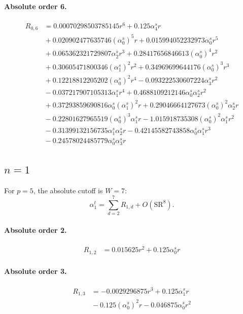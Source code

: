 \documentclass[10pt]{article}
\begin{document}
\paragraph{Absolute order 6.}
\begin{align*}
R_{0,6} &= 0.00070298503785145 r^{6} + 0.125 \alpha_{4}^s r \\
&{}  + 0.020902477635746 \left(\alpha_{0}^s\right)^{5} r + 0.015994052232973 \alpha_{0}^s r^{5} \\
&{}  + 0.065362321729807 \alpha_{2}^s r^{3} + 0.28417656846613 \left(\alpha_{0}^s\right)^{4} r^{2} \\
&{}  + 0.30605471800346 \left(\alpha_{1}^s\right)^{2} r^{2} + 0.34969699644176 \left(\alpha_{0}^s\right)^{3} r^{3} \\
&{}  + 0.12218812205202 \left(\alpha_{0}^s\right)^{2} r^{4} - 0.093222530607224 \alpha_{3}^s r^{2} \\
&{}  - 0.037217907105313 \alpha_{1}^s r^{4} + 0.4688109212146 \alpha_{0}^s \alpha_{2}^s r^{2} \\
&{}  + 0.37293859690816 \alpha_{0}^s \left(\alpha_{1}^s\right)^{2} r + 0.29046664127673 \left(\alpha_{0}^s\right)^{2} \alpha_{2}^s r \\
&{}  - 0.22801627965519 \left(\alpha_{0}^s\right)^{3} \alpha_{1}^s r - 1.015918735308 \left(\alpha_{0}^s\right)^{2} \alpha_{1}^s r^{2} \\
&{}  - 0.31399132156735 \alpha_{1}^s \alpha_{2}^s r - 0.42145582743858 \alpha_{0}^s \alpha_{1}^s r^{3} \\
&{}  - 0.24578024485779 \alpha_{0}^s \alpha_{3}^s r
\end{align*}

\subsection{$n=1$}
For $p=5$, the absolute cutoff is $W=7$:
\[\alpha_{1}^t=\sum_{d=2}^{7}R_{1,d}+O(\mathrm{SR}^{8}).\]
\paragraph{Absolute order 2.}
\begin{align*}
R_{1,2} &= 0.015625 r^{2} + 0.125 \alpha_{0}^s r
\end{align*}

\paragraph{Absolute order 3.}
\begin{align*}
R_{1,3} &=  - 0.0029296875 r^{3} + 0.125 \alpha_{1}^s r \\
&{}  - 0.125 \left(\alpha_{0}^s\right)^{2} r - 0.046875 \alpha_{0}^s r^{2}
\end{align*}
\end{document}
